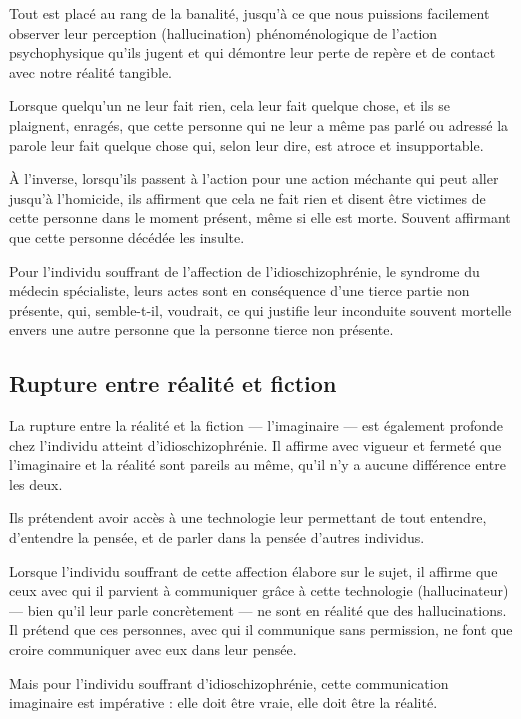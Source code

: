 \documentclass[12pt,oneside]{article}
\begin{document}
Tout est placé au rang de la banalité, jusqu'à ce que nous puissions facilement observer leur perception (hallucination) phénoménologique de l'action psychophysique qu'ils jugent et qui démontre leur perte de repère et de contact avec notre réalité tangible.

Lorsque quelqu'un ne leur fait rien, cela leur fait quelque chose, et ils se plaignent, enragés, que cette personne qui ne leur a même pas parlé ou adressé la parole leur fait quelque chose qui, selon leur dire, est atroce et insupportable.

À l'inverse, lorsqu'ils passent à l'action pour une action méchante qui peut aller jusqu'à l'homicide, ils affirment que cela ne fait rien et disent être victimes de cette personne dans le moment présent, même si elle est morte. Souvent affirmant que cette personne décédée les insulte.

Pour l'individu souffrant de l'affection de l'idioschizophrénie, le syndrome du médecin spécialiste, leurs actes sont en conséquence d'une tierce partie non présente, qui, semble-t-il, voudrait, ce qui justifie leur inconduite souvent mortelle envers une autre personne que la personne tierce non présente.

\subsection{Rupture entre réalité et fiction}

La rupture entre la réalité et la fiction --- l'imaginaire --- est également profonde chez l'individu atteint d'idioschizophrénie. Il affirme avec vigueur et fermeté que l'imaginaire et la réalité sont pareils au même, qu'il n'y a aucune différence entre les deux.

Ils prétendent avoir accès à une technologie leur permettant de tout entendre, d'entendre la pensée, et de parler dans la pensée d'autres individus.

Lorsque l'individu souffrant de cette affection élabore sur le sujet, il affirme que ceux avec qui il parvient à communiquer grâce à cette technologie (hallucinateur) --- bien qu'il leur parle concrètement --- ne sont en réalité que des hallucinations. Il prétend que ces personnes, avec qui il communique sans permission, ne font que croire communiquer avec eux dans leur pensée.

Mais pour l'individu souffrant d'idioschizophrénie, cette communication imaginaire est impérative : elle doit être vraie, elle doit être la réalité.
\end{document}
